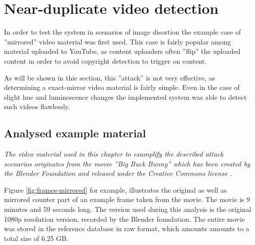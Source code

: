 \section{Near-duplicate video detection}
\label{sec:mirrored-video-detection}
In order to test the system in scenarios of image disortion the example case of ''mirrored'' video material was first used. This case is fairly popular among material uploaded to YouTube, as content uploaders often ''flip'' the uploaded content in order to avoid copyright detection to trigger on content.

As will be shown in thie section, this ''attack'' is not very effective, as determining a exact-mirror video material is fairly simple. Even in the case of slight hue and luminescence changes the implemented system was able to detect such videos flawlessly.

\subsection{Analysed example material}
\textit{The video material used in this chapter to examplify the described attack scenarios originates from the movie ''\textit{Big Buck Bunny}'' \cite{big-buck-bunny} which has been created by the Blender Foundation \cite{blender-foundation} and released under the Creative Commons license \cite{creative-commons}.}

Figure \ref{fig:frames-mirrored} for example, illustrates the original as well as mirrored counter part of an example frame taken from the movie. The movie is 9 minutes and 59 seconds long. The version used during this analysis is the original 1080p resolution version, recorded by the Blender foundation. The entire movie was stored in the reference database in raw format, which amounts amounts to a total size of 6.25 GB.


